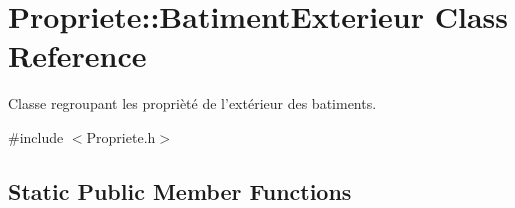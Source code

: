 \hypertarget{classPropriete_1_1BatimentExterieur}{\section{Propriete\-:\-:Batiment\-Exterieur Class Reference}
\label{classPropriete_1_1BatimentExterieur}
}


Classe regroupant les proprièté de l'extérieur des batiments.  




{\ttfamily \#include $<$Propriete.\-h$>$}

\subsection*{Static Public Member Functions}
